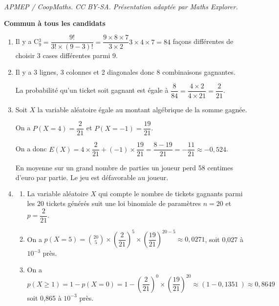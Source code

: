 \documentclass[10pt]{article}
\providecommand{\np}[2][]{{#2~#1}}
\begin{document}
\noindent\textit{APMEP / CoopMaths. CC BY-SA. Présentation adaptée par Maths Explorer.}\par\medskip
\textbf{Commun à tous les candidats}

\medskip

















\medskip

\begin{enumerate}
\item 
Il y a C$_9^3 = \dfrac{9!}{3! \times (9 - 3)!} = \dfrac{9 \times 8 \times 7}{3 \times 2}3 \times 4 \times 7 = 84$ façons différentes de choisir 3 cases différentes parmi 9.
\item 
Il y a 3 lignes, 3 colonnes et 2 diagonales donc 8 combinaisons gagnantes.

La probabilité qu'un ticket soit gagnant est égale à $\dfrac{8}{84} = \dfrac{4\times 2}{4 \times 21} = \dfrac{2}{21}$.
\item 
Soit $X$ la variable aléatoire égale au montant algébrique de la somme gagnée.

On a $P(X  = 4) = \dfrac{2}{21}$ et $P(X = - 1) = \dfrac{19}{21}$.

On a donc $E(X) = 4 \times \dfrac{2}{21} + (- 1) \times \dfrac{19}{21} = \dfrac{8 - 19}{21} = - \dfrac{11}{21} \approx - 0,524$.

En moyenne sur un grand nombre de parties un joueur perd 58 centimes d'euro par partie. Le jeu est défavorable au joueur.
\item 
	\begin{enumerate}
		\item 
La variable aléatoire $X$ qui compte le nombre de tickets gagnants parmi les $20$ tickets générés suit une loi binomiale de paramètres $n = 20$ et $p = \dfrac{2}{21}$.
		\item 
On a $p(X = 5) = \binom{20}{5}\times \left(\dfrac{2}{21}\right)^5\times \left(\dfrac{19}{21}\right)^{20-5} \approx 0,0271$, soit 0,027 à $10^{-3}$ près.
		\item 
On a $p(X \geqslant 1) = 1 - p(X = 0) = 1 - \left(\dfrac{2}{21}\right)^{0}\times \left(\dfrac{19}{21}\right)^{20}  \approx (1 - \np{0,1351}) \approx \np{0,8649}$ soit 0,865 à $10^{-3}$ près.
	\end{enumerate}
\end{enumerate}

\bigskip
\end{document}
